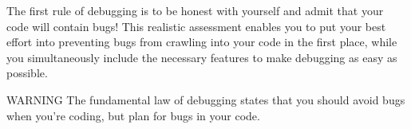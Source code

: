 The first rule of debugging is to be honest with yourself and admit that your code will contain bugs! This realistic assessment enables you to put your best effort into preventing bugs from crawling into your code in the first place, while you simultaneously include the necessary features to make debugging as easy as possible.

\begin{myWarning}{WARNING}
The fundamental law of debugging states that you should avoid bugs when you’re coding, but plan for bugs in your code.
\end{myWarning}













